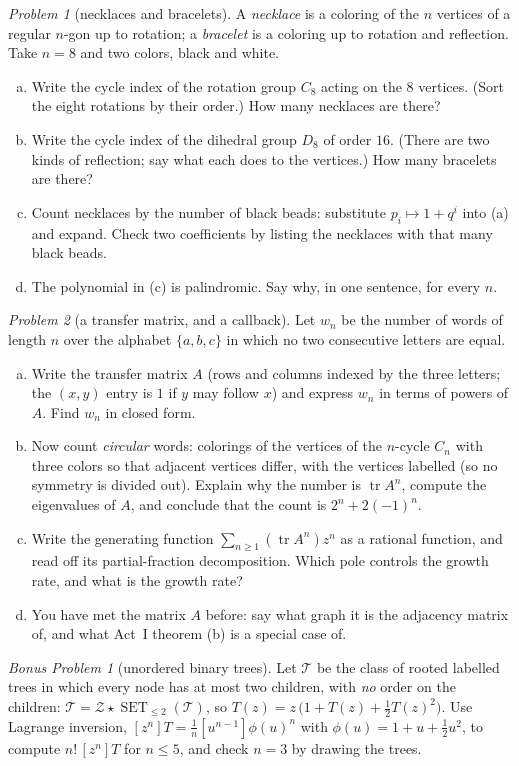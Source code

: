 \documentclass[11pt,twoside]{amsart}
\theoremstyle{plain}
\theoremstyle{remark}
\newtheorem{prob}{Problem}
\newtheorem*{bonus*}{Bonus Problem}
\theoremstyle{definition}
\newcommand{\SET}{\operatorname{SET}}
\newcommand{\cT}{\mathcal T}
\newcommand{\tr}{\operatorname{tr}}
\begin{document}
\begin{prob}[necklaces and bracelets]
A \emph{necklace} is a coloring of the $n$ vertices of a regular $n$-gon up to rotation; a
\emph{bracelet} is a coloring up to rotation and reflection. Take $n=8$ and two colors, black
and white.
\begin{enumerate}[(a)]
\item Write the cycle index of the rotation group $C_8$ acting on the $8$ vertices. (Sort the
eight rotations by their order.) How many necklaces are there?
\item Write the cycle index of the dihedral group $D_8$ of order $16$. (There are two kinds of
reflection; say what each does to the vertices.) How many bracelets are there?
\item Count necklaces by the number of black beads: substitute $p_i\mapsto 1+q^i$ into (a) and
expand. Check two coefficients by listing the necklaces with that many black beads.
\item The polynomial in (c) is palindromic. Say why, in one sentence, for every $n$.
\end{enumerate}
\end{prob}

\begin{prob}[a transfer matrix, and a callback]
Let $w_n$ be the number of words of length $n$ over the alphabet $\{a,b,c\}$ in which no two
consecutive letters are equal.
\begin{enumerate}[(a)]
\item Write the transfer matrix $A$ (rows and columns indexed by the three letters; the
$(x,y)$ entry is $1$ if $y$ may follow $x$) and express $w_n$ in terms of powers of $A$. Find
$w_n$ in closed form.
\item Now count \emph{circular} words: colorings of the vertices of the $n$-cycle $C_n$ with
three colors so that adjacent vertices differ, with the vertices labelled (so no symmetry is
divided out). Explain why the number is $\tr A^n$, compute the eigenvalues of $A$, and conclude
that the count is $2^n+2(-1)^n$.
\item Write the generating function $\sum_{n\ge1}(\tr A^n)z^n$ as a rational function, and
read off its partial-fraction decomposition. Which pole controls the growth rate, and what is the
growth rate?
\item You have met the matrix $A$ before: say what graph it is the adjacency matrix of, and
what Act~I theorem (b) is a special case of.
\end{enumerate}
\end{prob}

\begin{bonus*}[unordered binary trees]
Let $\cT$ be the class of rooted labelled trees in which every node has at most two children,
with \emph{no} order on the children: $\cT=\mathcal Z\star\SET_{\le2}(\cT)$, so
$T(z)=z\,\bigl(1+T(z)+\tfrac12T(z)^2\bigr)$. Use Lagrange inversion,
$[z^n]T=\frac1n[u^{n-1}]\phi(u)^n$ with $\phi(u)=1+u+\tfrac12u^2$, to compute $n!\,[z^n]T$ for
$n\le5$, and check $n=3$ by drawing the trees.
\end{bonus*}
\end{document}
